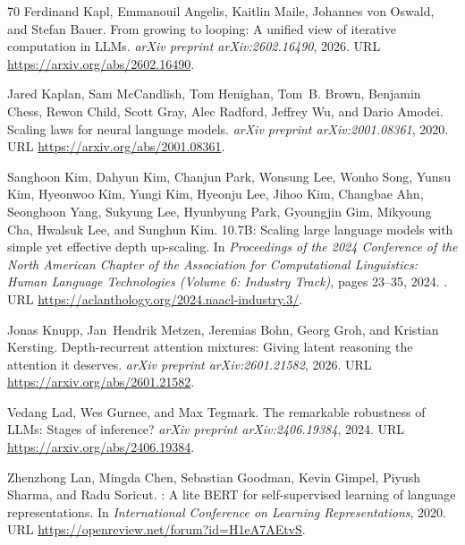 \documentclass[]{bytedance_seed}
\theoremstyle{definition}
\theoremstyle{remark}
\begin{document}
\begin{thebibliography}{70}
Ferdinand Kapl, Emmanouil Angelis, Kaitlin Maile, Johannes von Oswald, and
  Stefan Bauer.
\newblock From growing to looping: A unified view of iterative computation in
  {LLM}s.
\newblock \emph{arXiv preprint arXiv:2602.16490}, 2026.
\newblock URL \url{https://arxiv.org/abs/2602.16490}.

Jared Kaplan, Sam McCandlish, Tom Henighan, Tom~B. Brown, Benjamin Chess, Rewon
  Child, Scott Gray, Alec Radford, Jeffrey Wu, and Dario Amodei.
\newblock Scaling laws for neural language models.
\newblock \emph{arXiv preprint arXiv:2001.08361}, 2020.
\newblock URL \url{https://arxiv.org/abs/2001.08361}.

Sanghoon Kim, Dahyun Kim, Chanjun Park, Wonsung Lee, Wonho Song, Yunsu Kim,
  Hyeonwoo Kim, Yungi Kim, Hyeonju Lee, Jihoo Kim, Changbae Ahn, Seonghoon
  Yang, Sukyung Lee, Hyunbyung Park, Gyoungjin Gim, Mikyoung Cha, Hwalsuk Lee,
  and Sunghun Kim.
 10.7{B}: Scaling large language models with simple yet
  effective depth up-scaling.
\newblock In \emph{Proceedings of the 2024 Conference of the North American
  Chapter of the Association for Computational Linguistics: Human Language
  Technologies (Volume 6: Industry Track)}, pages 23--35, 2024.
\newblock {}.
\newblock URL \url{https://aclanthology.org/2024.naacl-industry.3/}.

Jonas Knupp, Jan~Hendrik Metzen, Jeremias Bohn, Georg Groh, and Kristian
  Kersting.
\newblock Depth-recurrent attention mixtures: Giving latent reasoning the
  attention it deserves.
\newblock \emph{arXiv preprint arXiv:2601.21582}, 2026.
\newblock URL \url{https://arxiv.org/abs/2601.21582}.

Vedang Lad, Wes Gurnee, and Max Tegmark.
\newblock The remarkable robustness of {LLM}s: Stages of inference?
\newblock \emph{arXiv preprint arXiv:2406.19384}, 2024.
\newblock URL \url{https://arxiv.org/abs/2406.19384}.

Zhenzhong Lan, Mingda Chen, Sebastian Goodman, Kevin Gimpel, Piyush Sharma, and
  Radu Soricut.
: A lite {BERT} for self-supervised learning of language
  representations.
\newblock In \emph{International Conference on Learning Representations}, 2020.
\newblock URL \url{https://openreview.net/forum?id=H1eA7AEtvS}.


\end{thebibliography}
\end{document}
